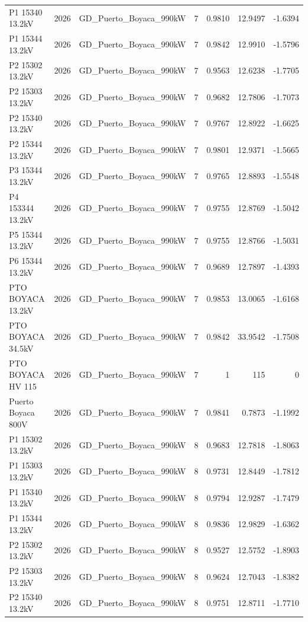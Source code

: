 \documentclass[11pt,a4paper]{article}
\begin{document}
\begin{longtable}{llllrrr}
P1 15340 13.2kV & 2026 & GD\_Puerto\_Boyaca\_990kW & 7 & 0.9810 & 12.9497 & -1.6394 \\
P1 15344 13.2kV & 2026 & GD\_Puerto\_Boyaca\_990kW & 7 & 0.9842 & 12.9910 & -1.5796 \\
P2 15302 13.2kV & 2026 & GD\_Puerto\_Boyaca\_990kW & 7 & 0.9563 & 12.6238 & -1.7705 \\
P2 15303 13.2kV & 2026 & GD\_Puerto\_Boyaca\_990kW & 7 & 0.9682 & 12.7806 & -1.7073 \\
P2 15340 13.2kV & 2026 & GD\_Puerto\_Boyaca\_990kW & 7 & 0.9767 & 12.8922 & -1.6625 \\
P2 15344 13.2kV & 2026 & GD\_Puerto\_Boyaca\_990kW & 7 & 0.9801 & 12.9371 & -1.5665 \\
P3 15344 13.2kV & 2026 & GD\_Puerto\_Boyaca\_990kW & 7 & 0.9765 & 12.8893 & -1.5548 \\
P4 153344 13.2kV & 2026 & GD\_Puerto\_Boyaca\_990kW & 7 & 0.9755 & 12.8769 & -1.5042 \\
P5 15344 13.2kV & 2026 & GD\_Puerto\_Boyaca\_990kW & 7 & 0.9755 & 12.8766 & -1.5031 \\
P6 15344 13.2kV & 2026 & GD\_Puerto\_Boyaca\_990kW & 7 & 0.9689 & 12.7897 & -1.4393 \\
PTO BOYACA 13.2kV & 2026 & GD\_Puerto\_Boyaca\_990kW & 7 & 0.9853 & 13.0065 & -1.6168 \\
PTO BOYACA 34.5kV & 2026 & GD\_Puerto\_Boyaca\_990kW & 7 & 0.9842 & 33.9542 & -1.7508 \\
PTO BOYACA HV 115 & 2026 & GD\_Puerto\_Boyaca\_990kW & 7 & 1 & 115 & 0 \\
Puerto Boyaca 800V & 2026 & GD\_Puerto\_Boyaca\_990kW & 7 & 0.9841 & 0.7873 & -1.1992 \\
P1 15302 13.2kV & 2026 & GD\_Puerto\_Boyaca\_990kW & 8 & 0.9683 & 12.7818 & -1.8063 \\
P1 15303 13.2kV & 2026 & GD\_Puerto\_Boyaca\_990kW & 8 & 0.9731 & 12.8449 & -1.7812 \\
P1 15340 13.2kV & 2026 & GD\_Puerto\_Boyaca\_990kW & 8 & 0.9794 & 12.9287 & -1.7479 \\
P1 15344 13.2kV & 2026 & GD\_Puerto\_Boyaca\_990kW & 8 & 0.9836 & 12.9829 & -1.6362 \\
P2 15302 13.2kV & 2026 & GD\_Puerto\_Boyaca\_990kW & 8 & 0.9527 & 12.5752 & -1.8903 \\
P2 15303 13.2kV & 2026 & GD\_Puerto\_Boyaca\_990kW & 8 & 0.9624 & 12.7043 & -1.8382 \\
P2 15340 13.2kV & 2026 & GD\_Puerto\_Boyaca\_990kW & 8 & 0.9751 & 12.8711 & -1.7710 \\

\end{longtable}
\end{document}
